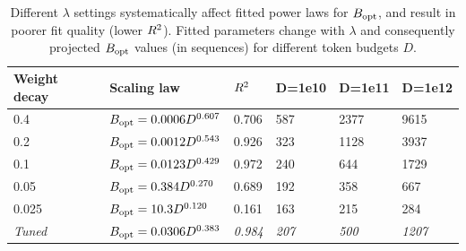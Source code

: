 \begin{table}[]
  \centering
  \caption{Different $\lambda$ settings systematically affect fitted
    power laws for $B_{\text{opt}}$, and result in poorer fit quality (lower
    $R^{2}$).  Fitted parameters change with $\lambda$ and
    consequently projected $B_{\text{opt}}$ values (in sequences) for different
    token budgets $D$.\label{tab:wd_bopt}}
  \begin{tabular}{@{}llllll@{}}
    \toprule
    Weight decay          & Scaling law                & $R^{2}$ & D=1e10          & D=1e11          & D=1e12          \\ \midrule
    0.4                   & $B_{\text{opt}} = 0.0006 D^{0.607}$ & 0.706  & 587             & 2377            & 9615            \\
    0.2                   & $B_{\text{opt}} = 0.0012 D^{0.543}$ & 0.926  & 323             & 1128            & 3937            \\
    0.1                   & $B_{\text{opt}} = 0.0123 D^{0.429}$ & 0.972  & 240             & 644             & 1729            \\
    0.05                  & $B_{\text{opt}} = 0.384 D^{0.270}$  & 0.689  & 192             & 358             & 667             \\
    0.025                 & $B_{\text{opt}} = 10.3 D^{0.120}$   & 0.161  & 163             & 215             & 284             \\
    \emph{Tuned}          & $B_{\text{opt}} = 0.0306 D^{0.383}$ & \emph{0.984} & \emph{207}      & \emph{500}      & \emph{1207}     \\ \bottomrule
  \end{tabular}
\end{table}
